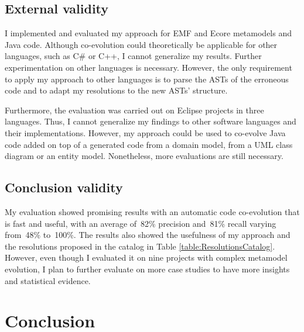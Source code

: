 \subsection{External validity} I implemented and evaluated my approach for EMF and Ecore metamodels and Java code. %
Although co-evolution could theoretically be applicable for other languages, such as C\# or C++, I cannot generalize my results. Further experimentation on other languages is necessary. However, the only requirement to apply my approach to other languages is to parse the ASTs of the erroneous code and to adapt my resolutions to the new ASTs' structure.  

Furthermore, the evaluation was carried out on Eclipse projects in three languages. Thus, I cannot generalize my findings to other software languages and their implementations. However, my approach could be used to co-evolve Java code added on top of a generated code from a domain model, \eg from a UML class diagram or an entity model. %
Nonetheless, more evaluations are still necessary. %

\subsection{Conclusion validity} My evaluation showed promising results with an automatic code co-evolution that is fast and useful, with an average of~82\% precision and~81\% recall varying from~48\% to~100\%. The results also showed the usefulness of my approach and the resolutions proposed in the catalog in Table \ref{table:ResolutionsCatalog}. However, even though I evaluated it on nine projects with complex metamodel evolution, I plan to further evaluate on more case studies to have more insights and statistical evidence.  %




\section{Conclusion}\label{ch1_conclusion}


